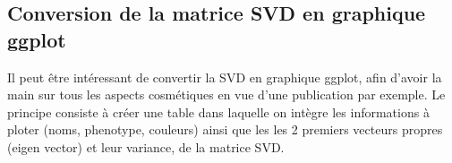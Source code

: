 \documentclass[
  openany]{book}
\theoremstyle{definition}
\theoremstyle{definition}
\theoremstyle{definition}
\theoremstyle{definition}
\theoremstyle{remark}
\begin{document}
\hypertarget{conversion-de-la-matrice-svd-en-graphique-ggplot}{%
\subsection*{Conversion de la matrice SVD en graphique ggplot}\label{conversion-de-la-matrice-svd-en-graphique-ggplot}}

Il peut être intéressant de convertir la SVD en graphique ggplot, afin d'avoir la main sur tous les aspects cosmétiques en vue d'une publication par exemple.
Le principe consiste à créer une table dans laquelle on intègre les informations à ploter (noms, phenotype, couleurs) ainsi que les les 2 premiers vecteurs propres (eigen vector) et leur variance, de la matrice SVD.
\end{document}
